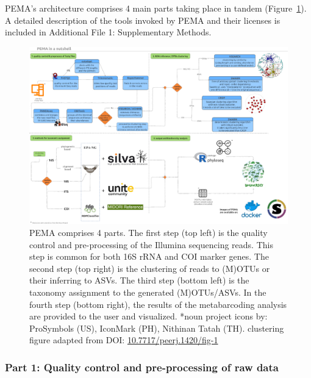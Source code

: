    PEMA's architecture comprises 4 main parts taking place in tandem (Figure~\ref{fig:pema-nutshell}). A detailed description of the tools invoked by PEMA and their licenses is included in Additional File 1: Supplementary Methods.

   \begin{figure}[h]
      \centering
      \includegraphics[width=0.95\columnwidth]{figures/pema_workflow.jpeg}
      \caption[PEMA in a nutshell]{PEMA comprises 4 parts. The first step (top left) is the quality control and pre-processing of the Illumina sequencing reads. This step is common for both 16S rRNA and COI marker genes. The second step (top right) is the clustering of reads to (M)OTUs or their inferring to ASVs. The third step (bottom left) is the taxonomy assignment to the generated (M)OTUs/ASVs. In the fourth step (bottom right), the results of the metabarcoding analysis are provided to the user and visualized. *noun project icons by: ProSymbols (US), IconMark (PH), Nithinan Tatah (TH). clustering figure adapted from 
      DOI: \href{https://peerj.com/articles/1420/\#fig-1}{10.7717/peerj.1420/fig-1}}
      \label{fig:pema-nutshell}
   \end{figure}


   \subsubsection{Part 1: Quality control and pre-processing of raw data}

